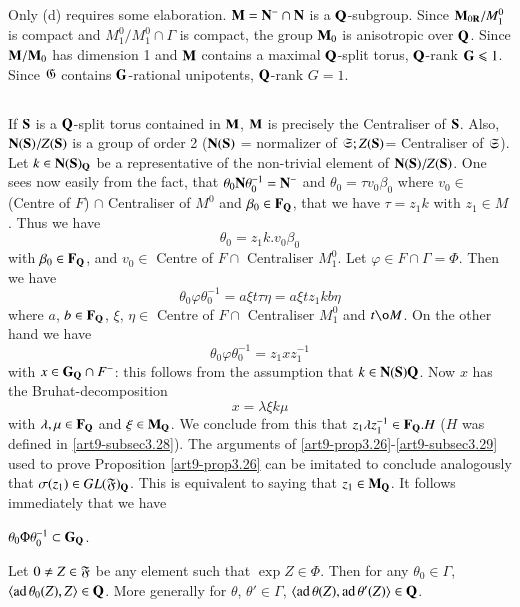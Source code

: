 Only (d) requires some elaboration. $\mathbf{M} = \mathbf{N}^- \cap \mathbf{N}$ is a $\mathbf{Q}$-subgroup. Since $\mathbf{M}_{0\mathbf{R}}/ M^0_1$ is compact and $M^0_1/M^0_1 \cap \Gamma$ is compact, the group $\mathbf{M}_0$ is anisotropic over $\mathbf{Q}$. Since $\mathbf{M}/\mathbf{M}_0$ has dimension 1 and $\mathbf{M}$ contains a maximal $\mathbf{Q}$-split torus, $\mathbf{Q}$-rank $\mathbf{G}\leqslant 1$. Since $\mathfrak{G}$ contains $\mathbf{G}$-rational unipotents, $\mathbf{Q}$-rank $G =1$.

\setcounter{subsection}{37}
\subsection{}\label{art-subsec3.38}
If $\mathbf{S}$ is a $\mathbf{Q}$-split torus contained in $\mathbf{M}$, $\mathbf{M}$ is precisely the Centraliser of $\mathbf{S}$. Also, $\mathbf{N}(\mathbf{S}) / Z (\mathbf{S})$ is a group of order 2 ($\mathbf{N} (\mathbf{S})$ = normalizer of $\mathfrak{S}; Z (\mathbf{S})$= Centraliser of $\mathfrak{S}$). Let $k \in \mathbf{N} (\mathbf{S})_{\mathbf{Q}}$ be a representative of the non-trivial element of $\mathbf{N} (\mathbf{S})/ Z (\mathbf{S})$. One sees now easily from the fact, that $\theta_0 \mathbf{N} \theta^{-1}_0 = \mathbf{N}^-$ and $\theta_0 = \tau v_0 \beta_0$ where $v_0 \in $ (Centre of $F$) $\cap$ Centraliser of $M^0$ and $\beta_0 \in \mathbf{F}_{\mathbf{Q}}$, that we have $\tau = z_1 k$ with $z_1 \in M$. Thus we have
$$
\theta_0 = z_1 k. v_0 \beta_0
$$
with $\beta_0 \in \mathbf{F}_{\mathbf{Q}}$, and $v_0 \in $ Centre of $F \cap$ Centraliser $M^0_1$. Let $\varphi \in F \cap \Gamma = \Phi$. Then we have 
$$
\theta_0 \varphi \theta^{-1}_0 = a \xi t \tau \eta = a \xi t z_1 k b \eta
$$
\pageoriginale
where $a$, $b \in \mathbf{F}_{\mathbf{Q}}$, $\xi$, $\eta \in $ Centre of $F \cap$ Centraliser $M^0_1$ and $t \o M$. On the other hand we have
$$
\theta_0 \varphi \theta^{-1}_0 = z_1 x z^{-1}_1
$$ 
with $x \in \mathbf{G}_{\mathbf{Q}} \cap F^-$: this follows from the assumption that $k \in \mathbf{N} (\mathbf{S})\mathbf{Q}$. Now $x$ has the Bruhat-decomposition
$$
x = \lambda \xi k \mu
$$
with $\lambda, \mu \in \mathbf{F}_{\mathbf{Q}}$ and $\xi \in \mathbf{M}_{\mathbf{Q}}$. We conclude from this that $z_1 \lambda z^{-1}_1 \in  \mathbf{F}_{\mathbf{Q}}.H$ ($H$ was defined in \ref{art9-subsec3.28}). The arguments of \ref{art9-prop3.26}-\ref{art9-subsec3.29} used to prove Proposition \ref{art9-prop3.26} can be imitated to conclude analogously that $\sigma (z_1) \in G L (\mathfrak{F})_{\mathbf{Q}}$. This is equivalent to saying that $z_1 \in \mathbf{M}_{\mathbf{Q}}$. It follows immediately that we have 

\setcounter{definition}{38}
\begin{proposition}\label{art9-prop3.39}
$\theta_0 \Phi \theta^{-1}_0 \subset \mathbf{G}_{\mathbf{Q}}$.
\end{proposition}

\begin{coro}\label{art9-coro3.40}
Let $0 \neq Z \in \mathfrak{F}$ be any element such that $\exp Z \in \Phi$. Then for any $\theta_0 \in \Gamma$, $\langle \operatorname{ad} \theta_0 (Z),Z \rangle \in \mathbf{Q}$. More generally for $\theta$, $\theta' \in \Gamma$, $\langle \operatorname{ad} \theta (Z), \operatorname{ad} \theta' (Z) \rangle \in \mathbf{Q}$.
\end{coro}

